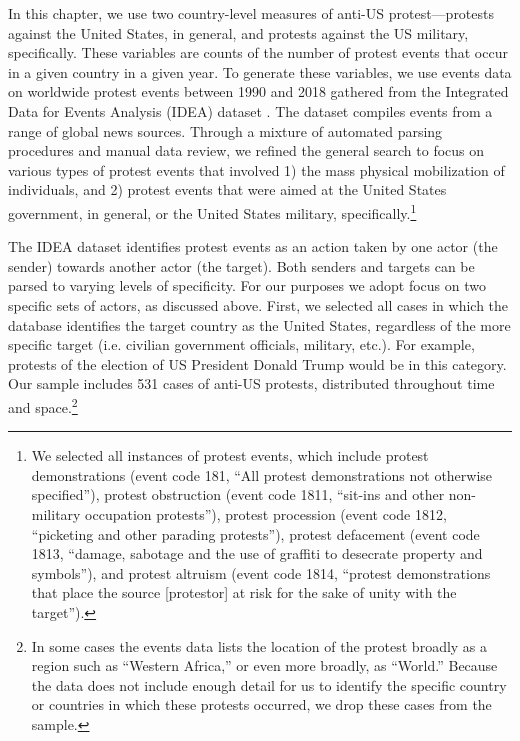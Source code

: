 In this chapter, we use two country-level measures of anti-US protest---protests against the United States, in general, and protests against the US military, specifically. These variables are counts of the number of protest events that occur in a given country in a given year. To generate these variables, we use events data on worldwide protest events between 1990 and 2018 gathered from the Integrated Data for Events Analysis (IDEA) dataset \cite{Bond2003}. The dataset compiles events from a range of global news sources. Through a mixture of automated parsing procedures and manual data review, we refined the general search to focus on various types of protest events that involved 1) the mass physical mobilization of individuals, and 2) protest events that were aimed at the United States government, in general, or the United States military, specifically.\footnote{We selected all instances of protest events, which include protest demonstrations (event code 181, ``All protest demonstrations not otherwise specified''), protest obstruction (event code 1811, ``sit-ins and other non-military occupation protests''), protest procession (event code 1812, ``picketing and other parading protests''), protest defacement (event code 1813, ``damage, sabotage and the use of graffiti to desecrate property and symbols''), and protest altruism (event code 1814, ``protest demonstrations that place the source [protestor] at risk for the sake of unity with the target'').}


The IDEA dataset identifies protest events as an action taken by one actor (the sender) towards another actor (the target). Both senders and targets can be parsed to varying levels of specificity. For our purposes we adopt focus on two specific sets of actors, as discussed above. First, we selected all cases in which the database identifies the target country as the United States, regardless of the more specific target (i.e. civilian government officials, military, etc.). For example, protests of the election of US President Donald Trump would be in this category. Our sample includes 531 cases of anti-US protests, distributed throughout time and space.\footnote{In some cases the events data lists the location of the protest broadly as a region such as ``Western Africa,'' or even more broadly, as ``World.'' Because the data does not include enough detail for us to identify the specific country or countries in which these protests occurred, we drop these cases from the sample.}

